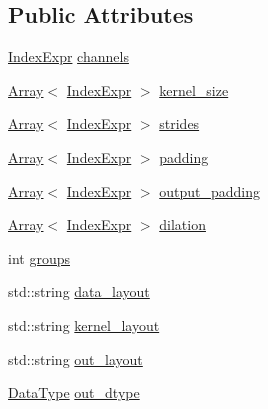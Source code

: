 \subsection*{Public Attributes}
\begin{DoxyCompactItemize}
\item 
\hyperlink{namespacetvm_1_1relay_ae153a27d81399fd266b8d598227764c4}{Index\+Expr} \hyperlink{structtvm_1_1relay_1_1Conv2DTransposeAttrs_ab270af38918c684563df21fa8aef866d}{channels}
\item 
\hyperlink{classtvm_1_1Array}{Array}$<$ \hyperlink{namespacetvm_1_1relay_ae153a27d81399fd266b8d598227764c4}{Index\+Expr} $>$ \hyperlink{structtvm_1_1relay_1_1Conv2DTransposeAttrs_ae3e9c3e0d37b837816276b2985d5295e}{kernel\+\_\+size}
\item 
\hyperlink{classtvm_1_1Array}{Array}$<$ \hyperlink{namespacetvm_1_1relay_ae153a27d81399fd266b8d598227764c4}{Index\+Expr} $>$ \hyperlink{structtvm_1_1relay_1_1Conv2DTransposeAttrs_a2cca4ce8d1729231cb667f810a14ba77}{strides}
\item 
\hyperlink{classtvm_1_1Array}{Array}$<$ \hyperlink{namespacetvm_1_1relay_ae153a27d81399fd266b8d598227764c4}{Index\+Expr} $>$ \hyperlink{structtvm_1_1relay_1_1Conv2DTransposeAttrs_aa09a7575475716d658595c23e6a1b399}{padding}
\item 
\hyperlink{classtvm_1_1Array}{Array}$<$ \hyperlink{namespacetvm_1_1relay_ae153a27d81399fd266b8d598227764c4}{Index\+Expr} $>$ \hyperlink{structtvm_1_1relay_1_1Conv2DTransposeAttrs_ac7bd13f11eeec17e9e9c97f6ff09924d}{output\+\_\+padding}
\item 
\hyperlink{classtvm_1_1Array}{Array}$<$ \hyperlink{namespacetvm_1_1relay_ae153a27d81399fd266b8d598227764c4}{Index\+Expr} $>$ \hyperlink{structtvm_1_1relay_1_1Conv2DTransposeAttrs_a30f6e24172d522b9a3ae228ead058e0b}{dilation}
\item 
int \hyperlink{structtvm_1_1relay_1_1Conv2DTransposeAttrs_a17abe1064acbc6d984153498caeaf9f3}{groups}
\item 
std\+::string \hyperlink{structtvm_1_1relay_1_1Conv2DTransposeAttrs_a44339b9feda8c50da6518cd7d66d9727}{data\+\_\+layout}
\item 
std\+::string \hyperlink{structtvm_1_1relay_1_1Conv2DTransposeAttrs_ad0839f3b82465c887a7da60c36b1bff0}{kernel\+\_\+layout}
\item 
std\+::string \hyperlink{structtvm_1_1relay_1_1Conv2DTransposeAttrs_a51c1ecd25ffa7030b204acea2f029d09}{out\+\_\+layout}
\item 
\hyperlink{namespacetvm_a41918af1a1dc386388639a9d3ad06c5d}{Data\+Type} \hyperlink{structtvm_1_1relay_1_1Conv2DTransposeAttrs_ab50c790cf49ae6efad0f34b63c828353}{out\+\_\+dtype}
\end{DoxyCompactItemize}
